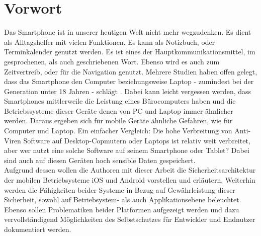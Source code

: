 \section{Vorwort}
	Das Smartphone ist in unserer heutigen Welt nicht mehr wegzudenken. Es dient
	als Alltagshelfer mit vielen Funktionen. Es kann als Notizbuch, oder
	Terminkalender genutzt werden. Es ist eines der Hauptkommunikationsmittel, im
	gesprochenen, als auch geschriebenen Wort. Ebenso wird es auch zum
	Zeitvertreib, oder für die Navigation genutzt. Mehrere Studien haben offen 
	gelegt, dass das Smartphone den Computer beziehungsweise Laptop - zumindest
	bei der Generation unter 18 Jahren - schlägt
	\cite{BitkomStudieJugend2014}
	\cite{MPFSStudie2013}.
	Dabei kann leicht vergessen werden, dass Smartphones mittlerweile die Leistung
	eines Bürocomputers haben und die Betriebssysteme dieser Geräte denen von PC
	und Laptop immer ähnlicher werden. Daraus ergeben sich für mobile Geräte
	ähnliche Gefahren, wie für Computer und Laptop. Ein einfacher Vergleich: Die
	hohe Verbreitung von Anti-Viren Software auf Desktop-Copmutern oder Laptops ist
	relativ weit verbreitet, aber wer nutzt eine solche Software auf
	seinem Smartphone oder Tablet? Dabei sind auch auf diesen Geräten hoch
	sensible Daten gespeichert.\\
	Aufgrund dessen wollen die Authoren mit dieser Arbeit die
	Sicherheitsarchitektur der mobilen Betriebsysteme iOS und Android vorstellen
	und erläutern. Weiterhin werden die Fähigkeiten beider Systeme in Bezug auf
	Gewährleistung dieser Sicherheit, sowohl auf Betriebsystem- als auch
	Applikationsebene beleuchtet. Ebenso sollen Problematiken beider Platformen
	aufgezeigt werden und dazu vervollständigend Möglichkeiten des Selbstschutzes
	für Entwickler und Endnutzer dokumentiert werden.
